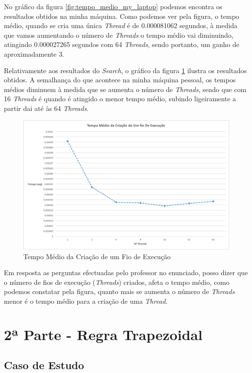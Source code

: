 \documentclass[conference,compsoc]{IEEEtran}
\begin{document}
No gráfico da figura \ref{fig:tempo_medio_my_laptop} podemos encontra os resultados obtidos na minha máquina. Como podemos ver pela figura, o tempo médio, quando se cria uma única \textit{Thread} é de 0.000081062 segundos, à medida que vamos aumentando o número de \textit{Threads} o tempo médio vai diminuindo, atingindo 0.000027265 segundos com 64 \textit{Threads}, sendo portanto, um ganho de aproximadamente 3. 

Relativamente aos resultados do \textit{Search}, o gráfico da figura \ref {fig:tempo_medio_search} ilustra os resultados obtidos. A semalhança do que acontece na minha máquina pessoal, os tempos médios diminuem à medida que se aumenta o número de \textit{Threads}, sendo que com 16 \textit{Threads} é quando é atingido o menor tempo médio, subindo ligeiramente a partir dai até às 64 \textit{Threads}.

\begin{figure}[h!]
\centering
\includegraphics[scale=0.325]{tempo_medio_search.png}
\caption{Tempo Médio da Criação de um Fio de Execução}
\label{fig:tempo_medio_search}
\end{figure}

Em resposta as perguntas efectuadas pelo professor no enunciado, posso dizer que o número de fios de execução (\textit{Threads}) criados, afeta o tempo médio, como podemos constatar pela figura, quanto mais se aumenta o número de \textit{Threads} menor é o tempo médio para a criação de uma \textit{Thread}.

\section{2ª Parte - Regra Trapezoidal\cite{trap_rule}}
\subsection{Caso de Estudo}
\end{document}
